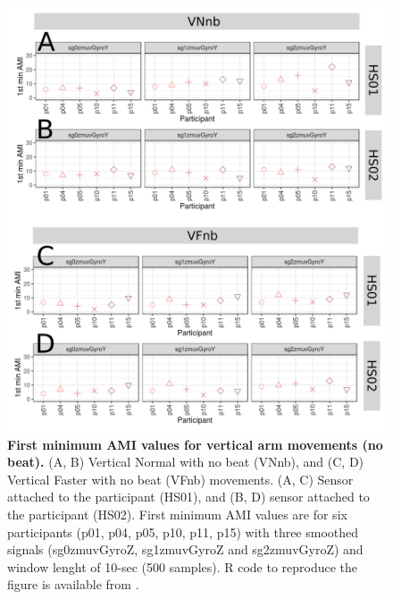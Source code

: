 \begin{figure}[!h]
\centering
\includegraphics[width=1.0\textwidth]{ami_Vnb_w10}
	\caption{
	{\bf First minimum AMI values for vertical arm movements (no beat).}
		(A, B) Vertical Normal with no beat (VNnb), and 
		(C, D) Vertical Faster with no beat (VFnb) movements.
		(A, C) Sensor attached to the participant (HS01), and
		(B, D) sensor attached to the participant (HS02).
		First minimum AMI values are for six participants 
		(p01, p04, p05, p10, p11, p15) with three smoothed 
		signals (sg0zmuvGyroZ, sg1zmuvGyroZ and sg2zmuvGyroZ) and 
		window lenght of 10-sec (500 samples).
		R code to reproduce the figure is available 
		from \cite{hwum2018}.
        }
    \label{fig:amiVnb}
\end{figure}

